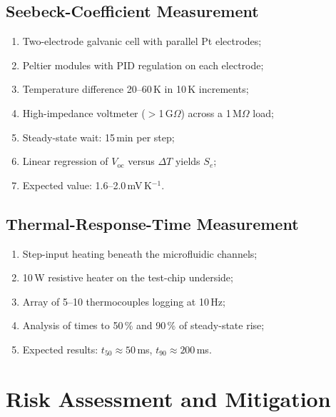 \documentclass[11pt,a4paper]{article}
\begin{document}
\subsection{Seebeck-Coefficient Measurement}
\begin{enumerate}[leftmargin=1.5em]
    \item Two-electrode galvanic cell with parallel Pt electrodes;
    \item Peltier modules with PID regulation on each electrode;
    \item Temperature difference 20--60\,K in 10\,K increments;
    \item High-impedance voltmeter ($>$1\,G$\Omega$) across a 1\,M$\Omega$ load;
    \item Steady-state wait: 15\,min per step;
    \item Linear regression of $V_{\mathrm{oc}}$ versus $\Delta T$ yields $S_e$;
    \item Expected value: 1.6--2.0\,mV\,K$^{-1}$.
\end{enumerate}

\subsection{Thermal-Response-Time Measurement}
\begin{enumerate}[leftmargin=1.5em]
    \item Step-input heating beneath the microfluidic channels;
    \item 10\,W resistive heater on the test-chip underside;
    \item Array of 5--10 thermocouples logging at 10\,Hz;
    \item Analysis of times to 50\,\% and 90\,\% of steady-state rise;
    \item Expected results: $t_{50}\approx50$\,ms, $t_{90}\approx200$\,ms.
\end{enumerate}

\section{Risk Assessment and Mitigation}
\end{document}
